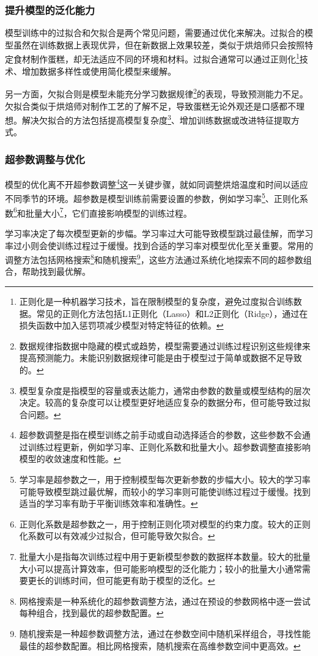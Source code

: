 \subsubsection{提升模型的泛化能力}

模型训练中的过拟合和欠拟合是两个常见问题，需要通过优化来解决。过拟合的模型虽然在训练数据上表现优异，但在新数据上效果较差，类似于烘焙师只会按照特定食材制作蛋糕，却无法适应不同的环境和材料。过拟合通常可以通过正则化\footnote{正则化是一种机器学习技术，旨在限制模型的复杂度，避免过度拟合训练数据。常见的正则化方法包括L1正则化（Lasso）和L2正则化（Ridge），通过在损失函数中加入惩罚项减少模型对特定特征的依赖。}技术、增加数据多样性或使用简化模型来缓解。

另一方面，欠拟合则是模型未能充分学习数据规律\footnote{数据规律指数据中隐藏的模式或趋势，模型需要通过训练过程识别这些规律来提高预测能力。未能识别数据规律可能是由于模型过于简单或数据不足导致的。}的表现，导致预测能力不足。欠拟合类似于烘焙师对制作工艺的了解不足，导致蛋糕无论外观还是口感都不理想。解决欠拟合的方法包括提高模型复杂度\footnote{模型复杂度是指模型的容量或表达能力，通常由参数的数量或模型结构的层次决定。较高的复杂度可以让模型更好地适应复杂的数据分布，但可能导致过拟合问题。}、增加训练数据或改进特征提取方式。

\subsubsection{超参数调整与优化}

模型的优化离不开超参数调整\footnote{超参数调整是指在模型训练之前手动或自动选择适合的参数，这些参数不会通过训练过程更新，例如学习率、正则化系数和批量大小。超参数调整直接影响模型的收敛速度和性能。}这一关键步骤，就如同调整烘焙温度和时间以适应不同季节的环境。超参数是模型训练前需要设置的参数，例如学习率\footnote{学习率是超参数之一，用于控制模型每次更新参数的步幅大小。较大的学习率可能导致模型跳过最优解，而较小的学习率则可能使训练过程过于缓慢。找到适当的学习率有助于平衡训练效率和准确性。}、正则化系数\footnote{正则化系数是超参数之一，用于控制正则化项对模型的约束力度。较大的正则化系数可以有效减少过拟合，但可能导致欠拟合。}和批量大小\footnote{批量大小是指每次训练过程中用于更新模型参数的数据样本数量。较大的批量大小可以提高计算效率，但可能影响模型的泛化能力；较小的批量大小通常需要更长的训练时间，但可能更有助于模型的泛化。}，它们直接影响模型的训练过程。

学习率决定了每次模型更新的步幅。学习率过大可能导致模型跳过最佳解，而学习率过小则会使训练过程过于缓慢。找到合适的学习率对模型优化至关重要。常用的调整方法包括网格搜索\footnote{网格搜索是一种系统化的超参数调整方法，通过在预设的参数网格中逐一尝试每种组合，找到最优的超参数配置。}和随机搜索\footnote{随机搜索是一种超参数调整方法，通过在参数空间中随机采样组合，寻找性能最佳的超参数配置。相比网格搜索，随机搜索在高维参数空间中更高效。}，这些方法通过系统化地探索不同的超参数组合，帮助找到最优解。

